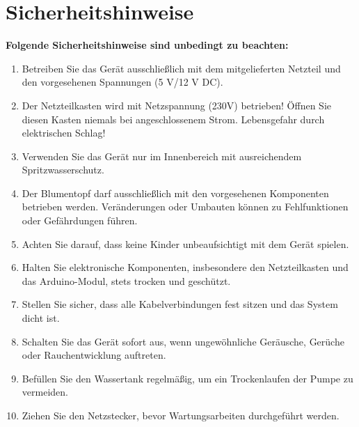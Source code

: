 \section{Sicherheitshinweise}
\textbf{Folgende Sicherheitshinweise sind unbedingt zu beachten:}\\
\begin{enumerate}
	\item Betreiben Sie das Gerät ausschließlich mit dem mitgelieferten Netzteil und den vorgesehenen Spannungen (5 V/12 V DC).
	\item Der Netzteilkasten wird mit Netzspannung (230V) betrieben! Öffnen Sie diesen Kasten niemals bei angeschlossenem Strom. Lebensgefahr durch elektrischen Schlag!
	\item Verwenden Sie das Gerät nur im Innenbereich mit ausreichendem Spritzwasserschutz.
	\item Der Blumentopf darf ausschließlich mit den vorgesehenen Komponenten betrieben werden. Veränderungen oder Umbauten können zu Fehlfunktionen oder Gefährdungen führen.
	\item Achten Sie darauf, dass keine Kinder unbeaufsichtigt mit dem Gerät spielen.
	\item Halten Sie elektronische Komponenten, insbesondere den Netzteilkasten und das Arduino-Modul, stets trocken und geschützt.
	\item Stellen Sie sicher, dass alle Kabelverbindungen fest sitzen und das System dicht ist.
	\item Schalten Sie das Gerät sofort aus, wenn ungewöhnliche Geräusche, Gerüche oder Rauchentwicklung auftreten.
	\item Befüllen Sie den Wassertank regelmäßig, um ein Trockenlaufen der Pumpe zu vermeiden.
	\item Ziehen Sie den Netzstecker, bevor Wartungsarbeiten durchgeführt werden.
\end{enumerate}

